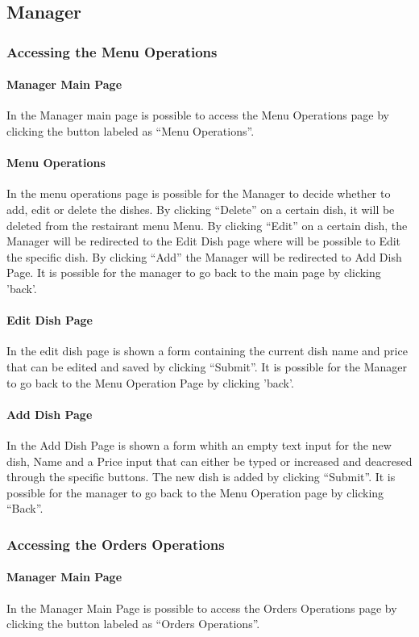 \subsection{Manager}
\subsubsection{Accessing the Menu Operations}
\paragraph{Manager Main Page}
In the Manager main page is possible to access the Menu Operations page by clicking the button labeled as ``Menu Operations''.

\paragraph{Menu Operations}
In the menu operations page is possible for the Manager to decide whether to add, edit or delete the dishes.
By clicking ``Delete'' on a certain dish, it will be deleted from the restairant menu Menu.
By clicking ``Edit'' on a certain dish, the Manager will be redirected to the Edit Dish page where will be possible to Edit the specific dish.
By clicking ``Add'' the Manager will be redirected to Add Dish Page.
It is possible for the manager to go back to the main page by clicking 'back'.

\paragraph{Edit Dish Page}
In the edit dish page is shown a form containing the current dish name and price that can be edited and saved by clicking ``Submit''.
It is possible for the Manager to go back to the Menu Operation Page by clicking 'back'.

\paragraph{Add Dish Page}
In the Add Dish Page is shown a form whith an empty text input for the new dish, Name and a Price input that can either be typed or increased and deacresed through the specific buttons. The new dish is added by clicking ``Submit''.
It is possible for the manager to go back to the Menu Operation page by clicking ``Back''.

\subsubsection{Accessing the Orders Operations}
\paragraph{Manager Main Page}
In the Manager Main Page is possible to access the Orders Operations page by clicking the button labeled as ``Orders Operations''.
